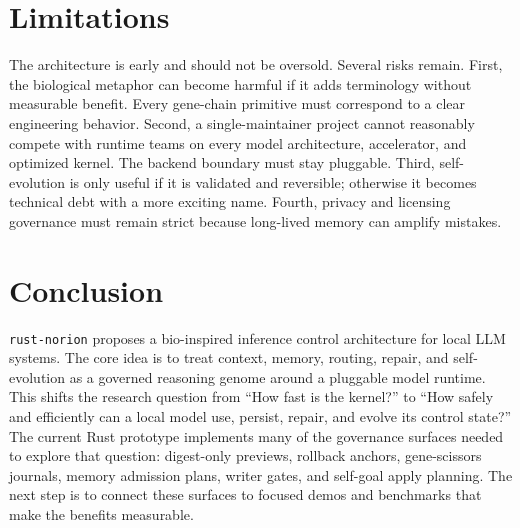 \documentclass[10pt]{article}
\begin{document}
\section{Limitations}

The architecture is early and should not be oversold. Several risks remain.
First, the biological metaphor can become harmful if it adds terminology
without measurable benefit. Every gene-chain primitive must correspond to a
clear engineering behavior. Second, a single-maintainer project cannot
reasonably compete with runtime teams on every model architecture, accelerator,
and optimized kernel. The backend boundary must stay pluggable. Third,
self-evolution is only useful if it is validated and reversible; otherwise it
becomes technical debt with a more exciting name. Fourth, privacy and licensing
governance must remain strict because long-lived memory can amplify mistakes.

\section{Conclusion}

\texttt{rust-norion} proposes a bio-inspired inference control architecture for
local LLM systems. The core idea is to treat context, memory, routing, repair,
and self-evolution as a governed reasoning genome around a pluggable model
runtime. This shifts the research question from ``How fast is the kernel?'' to
``How safely and efficiently can a local model use, persist, repair, and evolve
its control state?'' The current Rust prototype implements many of the
governance surfaces needed to explore that question: digest-only previews,
rollback anchors, gene-scissors journals, memory admission plans, writer gates,
and self-goal apply planning. The next step is to connect these surfaces to
focused demos and benchmarks that make the benefits measurable.
\end{document}
